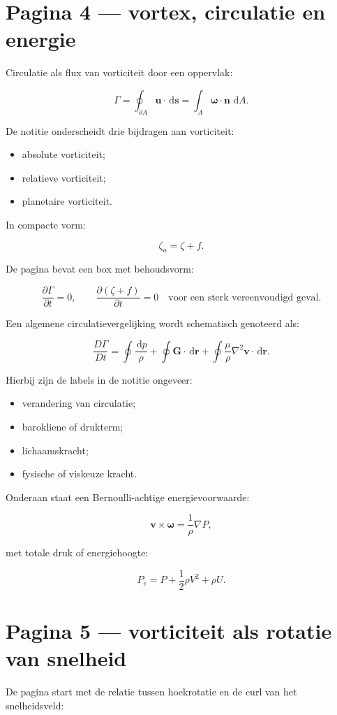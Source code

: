 \documentclass[11pt,a4paper]{article}
\newcommand{\vect}[1]{\mathbf{#1}}
\newcommand{\dd}{\,\mathrm{d}}
\begin{document}
\newpage

\section*{Pagina 4 --- vortex, circulatie en energie}
Circulatie als flux van vorticiteit door een oppervlak:

$$
\Gamma
=
\oint_{\partial A} \vect{u}\cdot\dd\vect{s}
=
\int_A \bm{\omega}\cdot\vect{n}\,\dd A.
$$

De notitie onderscheidt drie bijdragen aan vorticiteit:

\begin{itemize}
  \item absolute vorticiteit;
  \item relatieve vorticiteit;
  \item planetaire vorticiteit.
\end{itemize}

In compacte vorm:

$$
\zeta_a=\zeta+f.
$$

De pagina bevat een box met behoudsvorm:

$$
\frac{\partial \Gamma}{\partial t}=0,
\qquad
\frac{\partial(\zeta+f)}{\partial t}=0
\quad
\text{voor een sterk vereenvoudigd geval}.
$$

Een algemene circulatievergelijking wordt schematisch genoteerd als:

$$
\frac{D\Gamma}{Dt}
=
\oint \frac{\dd p}{\rho}
+
\oint \vect{G}\cdot\dd\vect{r}
+
\oint \frac{\mu}{\rho}\nabla^2\vect{v}\cdot\dd\vect{r}.
$$

Hierbij zijn de labels in de notitie ongeveer:

\begin{itemize}
  \item verandering van circulatie;
  \item barokliene of drukterm;
  \item lichaamskracht;
  \item fysische of viskeuze kracht.
\end{itemize}

Onderaan staat een Bernoulli-achtige energievoorwaarde:

$$
\vect{v}\times\bm{\omega}
=
\frac{1}{\rho}\nabla P,
$$

met totale druk of energiehoogte:

$$
P_e
=
P+\frac{1}{2}\rho V^2+\rho U.
$$

\newpage

\section*{Pagina 5 --- vorticiteit als rotatie van snelheid}
De pagina start met de relatie tussen hoekrotatie en de curl van het snelheidsveld:
\end{document}
